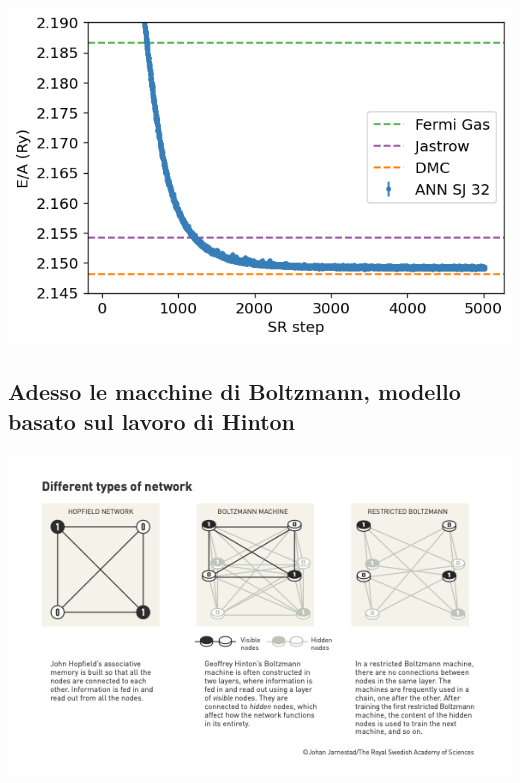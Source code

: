 \documentclass[%
oneside,                 %
final,                   %
10pt]{article}
\begin{document}
\begin{block}{}

\vspace{6mm}

\centerline{\includegraphics[width=0.9\linewidth]{figures/elgasnew.png}}

\vspace{6mm}

\end{block}

\subsection{Adesso le macchine di Boltzmann, modello basato sul lavoro di Hinton}

\vspace{6mm}

\centerline{\includegraphics[width=1.0\linewidth]{figures/boltzmannnobel.png}}

\vspace{6mm}
\end{document}
